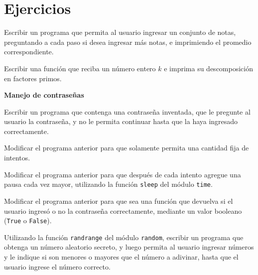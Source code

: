 \newpage
\section{Ejercicios}

\begin{ejercicio}
Escribir un programa que permita al usuario ingresar un conjunto de notas,
preguntando a cada paso si desea ingresar más notas, e imprimiendo el
promedio correspondiente.
\end{ejercicio}

\begin{ejercicio}
Escribir una función que reciba un número entero $k$ e imprima su
descomposición en factores primos.
\end{ejercicio}

\begin{ejercicio}
{\bf Manejo de contraseñas}
\begin{partes}
    \item Escribir un programa que contenga una contraseña inventada, que le
pregunte al usuario la contraseña, y no le permita continuar hasta que la
haya ingresado correctamente.
    \item Modificar el programa anterior para que solamente permita una
cantidad fija de intentos.
    \item Modificar el programa anterior para que después de cada intento
agregue una pausa cada vez mayor, utilizando la función \verb!sleep! del
módulo \verb!time!.
    \item Modificar el programa anterior para que sea una función que devuelva
si el usuario ingresó o no la contraseña correctamente, mediante un valor
booleano (\verb!True! o \verb!False!).
\end{partes}
\end{ejercicio}


\begin{ejercicio}
Utilizando la función \verb!randrange! del módulo \verb!random!,
escribir un programa que obtenga un número aleatorio secreto, y luego
permita al usuario ingresar números y le indique si son menores o mayores
que el número a adivinar, hasta que el usuario ingrese el número correcto.
\end{ejercicio}



